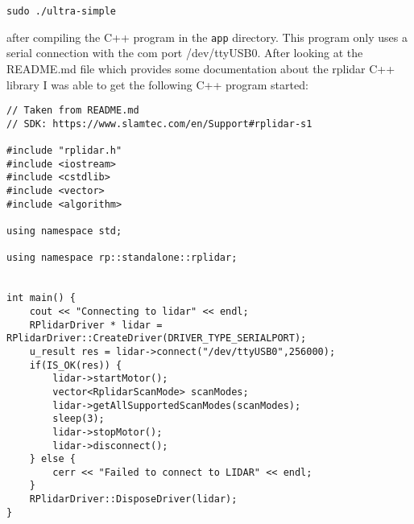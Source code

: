\documentclass[fontsize=11pt, %
                             paper=a4, %
                             twoside, %
                             captions=tableheading,
                             index=totoc,
                             hyperref]{labbook}
\begin{document}
\begin{addmargin}[0cm]{0cm}
\begin{Verbatim}
sudo ./ultra-simple
\end{Verbatim}
after compiling the C++ program in the \texttt{app} directory. This program only uses a serial connection with the com port /dev/ttyUSB$0$. After looking at the README.md file which provides some documentation about the rplidar C++ library I was able to get the following C++ program started:
\begin{Verbatim}
// Taken from README.md
// SDK: https://www.slamtec.com/en/Support#rplidar-s1

#include "rplidar.h"
#include <iostream>
#include <cstdlib>
#include <vector>
#include <algorithm>

using namespace std;

using namespace rp::standalone::rplidar;


int main() {
    cout << "Connecting to lidar" << endl;
	RPlidarDriver * lidar = RPlidarDriver::CreateDriver(DRIVER_TYPE_SERIALPORT);
    u_result res = lidar->connect("/dev/ttyUSB0",256000);
    if(IS_OK(res)) {
        lidar->startMotor();
        vector<RplidarScanMode> scanModes;
        lidar->getAllSupportedScanModes(scanModes);
        sleep(3);
        lidar->stopMotor();
        lidar->disconnect();
    } else {
        cerr << "Failed to connect to LIDAR" << endl;
    }
    RPlidarDriver::DisposeDriver(lidar);    
}
\end{Verbatim}
\end{addmargin} 





\end{document}
